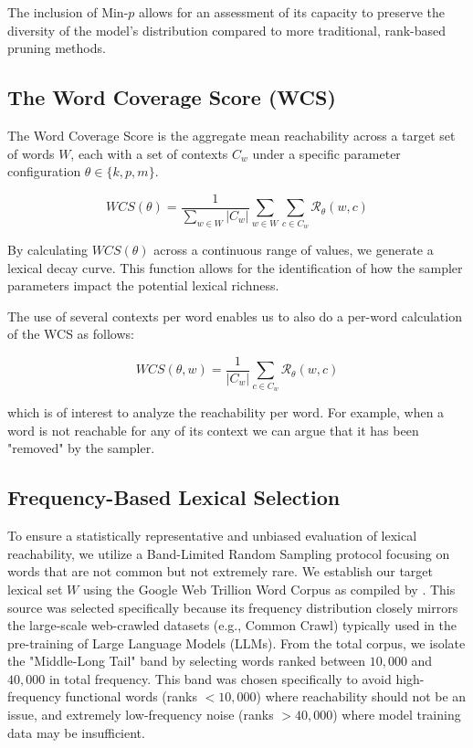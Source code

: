 \documentclass{article}
\begin{document}
The inclusion of Min-$p$ allows for an assessment of its capacity to preserve the diversity of the model's distribution compared to more traditional, rank-based pruning methods.


\subsection{The Word Coverage Score (WCS)}

The Word Coverage Score is the aggregate mean reachability across a target set of words $W$, each with a set of contexts $C_w$ under a specific parameter configuration $\theta \in \{k, p, m\}$.

\begin{equation}
WCS(\theta) = \frac{1}{\sum_{w \in W} |C_w|} \sum_{w \in W} \sum_{c \in C_w} \mathcal{R}_\theta(w, c)
\end{equation}

By calculating $WCS(\theta)$ across a continuous range of values, we generate a lexical decay curve. This function allows for the identification of how the sampler parameters impact the potential lexical richness.

The use of several contexts per word enables us to also do a per-word calculation of the WCS as follows:

\begin{equation}
WCS(\theta, w) = \frac{1}{|C_w|} \sum_{c \in C_w} \mathcal{R}_\theta(w, c)
\end{equation}

which is of interest to analyze the reachability per word. For example, when a word is not reachable for any of its context we can argue that it has been "removed" by the sampler.


\subsection{Frequency-Based Lexical Selection}

To ensure a statistically representative and unbiased evaluation of lexical reachability, we utilize a Band-Limited Random Sampling protocol focusing on words that are not common but not extremely rare. We establish our target lexical set $W$ using the Google Web Trillion Word Corpus as compiled by \cite{norvig2009}. This source was selected specifically because its frequency distribution closely mirrors the large-scale web-crawled datasets (e.g., Common Crawl) typically used in the pre-training of Large Language Models (LLMs). From the total corpus, we isolate the "Middle-Long Tail" band by selecting words ranked between $10,000$ and $40,000$ in total frequency. This band was chosen specifically to avoid high-frequency functional words (ranks $<10,000$) where reachability should not be an issue, and extremely low-frequency noise (ranks $>40,000$) where model training data may be insufficient.
\end{document}
